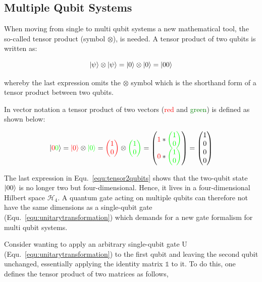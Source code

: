 
\subsection{Multiple Qubit Systems}
\label{subsec:multiplequbitsystems}

When moving from single to multi qubit systems a new mathematical tool, the so-called tensor product (symbol $\otimes$), is needed. A tensor product of two qubits is written as:

\begin{equation}
\ket{\psi} \otimes \ket{\psi} = \ket{0} \otimes \ket{0} = \ket{00}
\end{equation}
 
whereby the last expression omits the $\otimes$ symbol which is the shorthand form of a tensor product between two qubits.

In vector notation a tensor product of two vectors (\textcolor{red}{red} and \textcolor{green}{green}) is defined as shown below:

\begin{equation}
\label{equ:tensor2qubits}
\ket{\textcolor{red}{0}\textcolor{green}{0}} = \textcolor{red}{\ket{0}} \otimes \textcolor{green}{\ket{0}} = \textcolor{red}{\begin{pmatrix}1\\0\end{pmatrix}} \otimes \textcolor{green}{\begin{pmatrix}1\\0\end{pmatrix}} = \begin{pmatrix}\textcolor{red}{1}*\textcolor{green}{\begin{pmatrix}1\\0\end{pmatrix}}\\\textcolor{red}{0}*\textcolor{green}{\begin{pmatrix}1\\0\end{pmatrix}}\end{pmatrix} = \begin{pmatrix}1\\0\\0\\0\end{pmatrix}
\end{equation}

The last expression in Equ.~\ref{equ:tensor2qubits} shows that the two-qubit state $\ket{00}$ is no longer two but four-dimensional. Hence, it lives in a four-dimensional Hilbert space $\mathcal{H}_{4}$. A quantum gate acting on multiple qubits can therefore not have the same dimensions as a single-qubit gate (Equ.~\ref{equ:unitarytransformation}) which demands for a new gate formalism for multi qubit systems.

Consider wanting to apply an arbitrary single-qubit gate U (Equ.~\ref{equ:unitarytransformation}) to the first qubit and leaving the second qubit unchanged, essentially applying the identity matrix $\mathbb{1}$ to it. To do this, one defines the tensor product of two matrices as follows,

